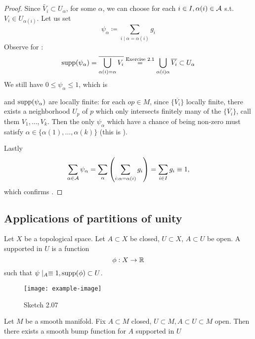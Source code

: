 \begin{proof}
     Since \(\tilde{V_i}\subset U_\alpha\), for some \(\alpha\), we can choose for each \(i\in I, \alpha(i)\in \mathcal{A}\) s.t. \(V_i\in U_{\alpha(i)}\).
    Let us set \[\psi_{\alpha}\coloneqq \sum_{i\mid \alpha=\alpha(i)}g_i\]
    Observe for : \[\text{supp}(\psi_\alpha)=\overline{\bigcup_{\alpha(i)=\alpha} V_i}\stackrel{\text{Exercise 2.1}}{=}\bigcup_{\alpha(i)\alpha}\overline{V_i}\subset U_\alpha\]
    We still have \(0\leq \psi_\alpha\leq 1\), which is 
    
    and 
    \(\text{supp}(\psi_\alpha)\) are locally finite: for each \(op\in M\), since \(\{\overline{V_i}\}\) locally finite,
    there exists a neighborhood \(U_p\) of \(p\)  which only intersects finitely many of the \(\{\overline{V_i}\}\), call 
    them \(V_1,\dots,V_k\). Then the only \(\psi_\alpha\) which have a chance of being non-zero must satisfy \(\alpha\in\{\alpha(1),\dots,\alpha(k)\}\) (this is ).

    Lastly \[\sum_{\alpha\in\mathcal{A}}\psi_\alpha=\sum_{\alpha}\left(\sum_{i: \alpha=\alpha(i)} g_i\right)=\sum_{i\in I} g_i\equiv 1,\]
    which confirms .

\end{proof}


\subsection{Applications of partitions of unity}

\begin{definition*}
    Let \(X\) be a topological space. Let \(A\subset X\) be closed, \(U\subset X\), \(A\subset U\) be open. 
    A  supported in \(U\) is a function \[\phi:X\to\mathbb{R}\]
    such that \(\psi\mid_A \equiv1, \text{supp}(\phi)\subset U\). 
\end{definition*}

\begin{figure}[H]
    \centering
    \texttt{[image: example-image]}
    \caption{Sketch 2.07}
\end{figure}

\begin{proposition}\label{prop:2.8}
    Let \(M\) be a smooth manifold. Fix \(A\subset M\) closed, \(U\subset M,A\subset U\subset M\) open.
    Then there exists a smooth bump function for \(A\) supported in \(U\)
\end{proposition}

